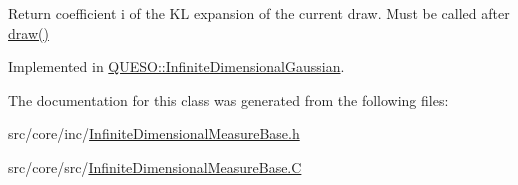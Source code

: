Return coefficient {\ttfamily i} of the K\-L expansion of the current draw. Must be called after \hyperlink{class_q_u_e_s_o_1_1_infinite_dimensional_measure_base_a6357b505c9d50f9a5c30583bdf361d7e}{draw()} 



Implemented in \hyperlink{class_q_u_e_s_o_1_1_infinite_dimensional_gaussian_a07eac1a9245e12bd3bc73ea65aac5ecf}{Q\-U\-E\-S\-O\-::\-Infinite\-Dimensional\-Gaussian}.



The documentation for this class was generated from the following files\-:\begin{DoxyCompactItemize}
\item 
src/core/inc/\hyperlink{_infinite_dimensional_measure_base_8h}{Infinite\-Dimensional\-Measure\-Base.\-h}\item 
src/core/src/\hyperlink{_infinite_dimensional_measure_base_8_c}{Infinite\-Dimensional\-Measure\-Base.\-C}\end{DoxyCompactItemize}
